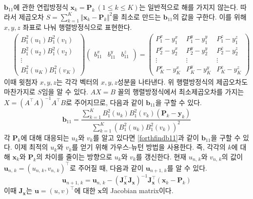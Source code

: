 \documentclass{gshs_thesis}
\theoremstyle{theorem}
\theoremstyle{lemma}
\theoremstyle{definition}
\begin{document}
$\mathbf{b}_{11}$에 관한 연립방정식 $\mathbf{x}_k = \mathbf{P}_k \ (1 \leq k \leq K)$는 일반적으로 해를 가지지 않는다. 따라서 제곱오차 $S = \sum_{k=1}^K \Vert \mathbf{x}_k - \mathbf{P}_k \Vert^2$을 최소로 만드는 $\mathbf{b}_{11}$의 값을 구한다. 이를 위해 $x, y, z$ 좌표로 나눠 행렬방정식으로 표현한다. 
\begin{align*}
	&\begin{pmatrix}
		B_1^2(u_1)B_1^2(v_1) \\ B_1^2(u_2)B_1^2(v_2) \\ \vdots \\ B_1^2(u_K)B_1^2(v_K)
	\end{pmatrix} \begin{pmatrix}
		b_{11}^x & b_{11}^y & b_{11}^z
	\end{pmatrix} 
	= \begin{pmatrix}
		P_1^x-y_1^x & P_1^y-y_1^y & P_1^z-y_1^z \\ P_2^x-y_2^x & P_2^y-y_2^y & P_2^z-y_2^z \\ \vdots & \vdots & \vdots \\ P_K^x-y_K^x & P_K^y-y_K^y & P_K^z-y_K^z
	\end{pmatrix}
\end{align*}
이때 윗첨자 $x, y, z$는 각각 벡터의 $x, y, z$성분을 나타낸다. 위 행렬방정식의 제곱오차도 마찬가지로 $S$임을 알 수 있다. $AX = B$ 꼴의 행렬방정식에서 최소제곱오차를 가지는 $X = (A^\intercal A)^{-1} A^\intercal B$로 주어지므로, 다음과 같이 $\mathbf{b}_{11}$을 구할 수 있다. 
\begin{equation} \label{forthfindb11}
	\mathbf{b}_{11} = \frac{\sum_{k=1}^K B_1^2(u_k) B_1^2 (v_k) (\mathbf{P}_k - \mathbf{y}_k)}{\sum_{k=1}^K (B_1^2(u_k) B_1^2(v_k))^2}
\end{equation}
각 $\mathbf{P}_k$에 대해 대응되는 $u_k$와 $v_k$를 알고 있다면 \eqref{forthfindb11}과 같이 $\mathbf{b}_{11}$을 구할 수 있다. 이제 최적의 $u_k$와 $v_k$를 얻기 위해 가우스-뉴턴 방법을 사용한다. 즉, 각각의 $k$에 대해 $\mathbf{x}_k$와 $\mathbf{P}_k$의 차이를 줄이는 방향으로 $u_k$와 $v_k$를 갱신한다. 현재 $u_{n, \, k}$와 $v_{n, \, k}$의 값이 $\mathbf{u}_{n, \, k} = (u_{n, \, k}, v_{n, \, k})^\intercal$로 주어질 때, 다음과 같이 $\mathbf{u}_{n+1, \, k}$를 알 수 있다. 
\begin{equation} \label{rearrange2}
	\mathbf{u}_{n+1, \, k} = \mathbf{u}_{n, \, k} - (\mathbf{J}_\mathbf{x}^\intercal \mathbf{J}_\mathbf{x})^{-1} \mathbf{J}_\mathbf{x}^\intercal (\mathbf{x}_k - \mathbf{P}_k)
\end{equation}
이때 $\mathbf{J}_\mathbf{x}$는 $\mathbf{u} = (u, v)^\intercal$에 대한 $\mathbf{x}$의 Jacobian matrix이다.
\end{document}
